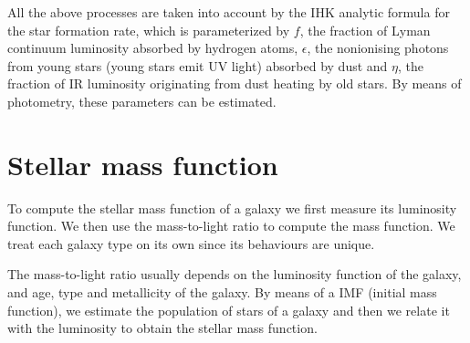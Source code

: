 \documentclass{_mypackages/monograph}
\begin{document}
All the above processes are taken into account by the IHK \cite{Inoue2000} analytic formula for the star formation rate, which is parameterized by \(f\), the  fraction of Lyman continuum luminosity absorbed by hydrogen atoms, \(\epsilon\), the nonionising photons from young stars (young stars emit UV light) absorbed by dust and \(\eta\), the fraction of IR luminosity originating from dust heating by old stars. By means of photometry, these parameters can be estimated.

\chapter{Stellar mass function}

To compute the stellar mass function of a galaxy we first measure its luminosity function. We then use the mass-to-light ratio to compute the mass function. We treat each galaxy type on its own since its behaviours are unique.

The mass-to-light ratio usually depends on the luminosity function of the galaxy, and age, type and metallicity of the galaxy. By means of a IMF (initial mass function), we estimate the population of stars of a galaxy and then we relate it with the luminosity to obtain the stellar mass function.

\backmatter
\printbib
\end{document}
